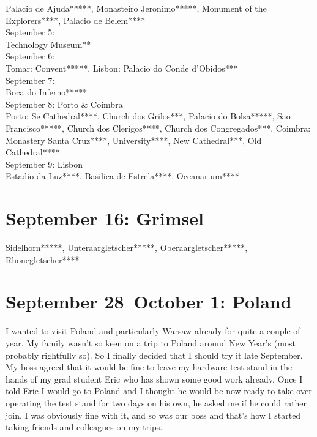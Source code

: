 Palacio de Ajuda*****, Monasteiro Jeronimo*****, Monument of the Explorers****, Palacio de Belem****\\

September 5:\\
Technology Museum**\\

September 6:\\
Tomar: Convent*****, Lisbon: Palacio do Conde d'Obidos***\\

September 7:\\
Boca do Inferno*****\\

September 8: Porto \& Coimbra\\
Porto: Se Cathedral****, Church dos Grilos***, Palacio do Bolsa*****, Sao Francisco*****, Church dos Clerigos****, Church dos Congregados***, Coimbra: Monastery Santa Cruz****, University****, New Cathedral***, Old Cathedral****\\

September 9: Lisbon\\
Estadio da Luz****, Basilica de Estrela****, Oceanarium****

\section{September 16: Grimsel}
\label{Grimsel2012}

Sidelhorn*****, Unteraargletscher*****, Oberaargletscher*****, Rhonegletscher****

\section{September 28--October 1: Poland}
\label{Poland2012}

I wanted to visit Poland and particularly Warsaw already for quite a couple of year. My family wasn't so keen on a trip to Poland around New Year's (most probably rightfully so). So I finally decided that I should try it late September. My boss agreed that it would be fine to leave my hardware test stand in the hands of my grad student Eric who has shown some good work already. Once I told Eric I would go to Poland and I thought he would be now ready to take over operating the test stand for two days on his own, he asked me if he could rather join. I was obviously fine with it, and so was our boss and that's how I started taking friends and colleagues on my trips.\\

